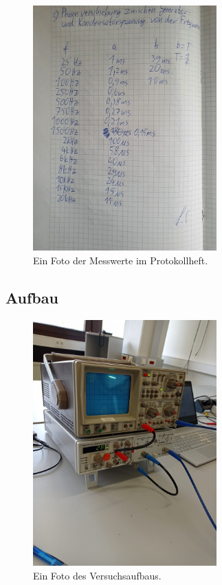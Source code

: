     \begin{figure}[H]
        \centering
        \includegraphics[width=0.63\textwidth]{latex/images/mess3.jpeg}
        \caption{Ein Foto der Messwerte im Protokollheft.}
        \label{img:mess3}
    \end{figure}





    \subsection{Aufbau}
    \begin{figure}[H]
        \centering
        \includegraphics[width=0.63\textwidth]{latex/images/aufbau.jpeg}
        \caption{Ein Foto des Versuchsaufbaus.}
        \label{img:mess1}
    \end{figure}
